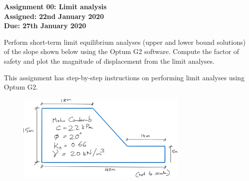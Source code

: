 \documentclass[a4paper,12pt]{article}
\begin{document}
\begin{centering}
	\textbf{
		Assignment 00: Limit analysis\\
		Assigned: 22nd January 2020\\
		Due: 27th January 2020\\
	}
\end{centering}

\vspace{1em}
 
Perform short-term limit equilibrium analyses (upper and lower bound solutions) of the slope shown below using the Optum G2 software. Compute the factor of safety and plot the magnitude of displacement from the limit analyses. 

This assignment has step-by-step instructions on performing limit analyses using Optum G2.

\begin{figure}[!h]
	\centering
	\includegraphics[width=0.75\textwidth]{figs/slope.png}
\end{figure}
\end{document}
